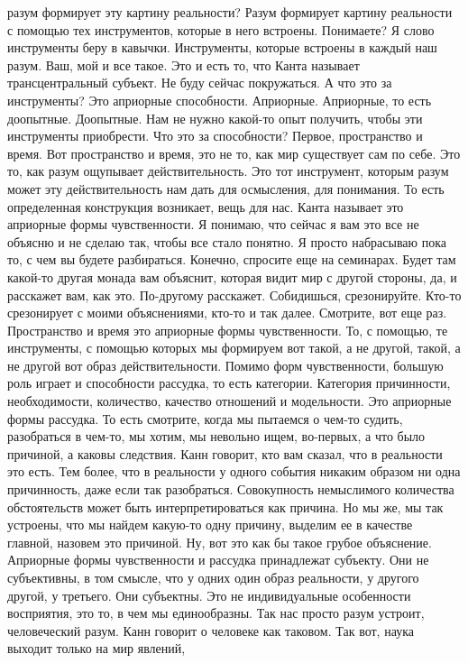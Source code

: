 разум формирует эту картину реальности? Разум формирует картину реальности с
помощью тех инструментов, которые в него встроены. Понимаете? Я слово
инструменты беру в кавычки. Инструменты, которые встроены в каждый наш разум.
Ваш, мой и все такое. Это и есть то, что Канта называет трансцентральный
субъект. Не буду сейчас покружаться. А что это за инструменты? Это априорные
способности. Априорные. Априорные, то есть доопытные. Доопытные. Нам не нужно
какой-то опыт получить, чтобы эти инструменты приобрести. Что это за
способности? Первое, пространство и время. Вот пространство и время, это не то,
как мир существует сам по себе. Это то, как разум ощупывает действительность.
Это тот инструмент, которым разум может эту действительность нам дать для
осмысления, для понимания. То есть определенная конструкция возникает, вещь для
нас. Канта называет это априорные формы чувственности. Я понимаю, что сейчас я
вам это все не объясню и не сделаю так, чтобы все стало понятно. Я просто
набрасываю пока то, с чем вы будете разбираться. Конечно, спросите еще на
семинарах. Будет там какой-то другая монада вам объяснит, которая видит мир с
другой стороны, да, и расскажет вам, как это. По-другому расскажет. Собидишься,
срезонируйте. Кто-то срезонирует с моими объяснениями, кто-то и так далее.
Смотрите, вот еще раз. Пространство и время это априорные формы чувственности.
То, с помощью, те инструменты, с помощью которых мы формируем вот такой, а не
другой, такой, а не другой вот образ действительности. Помимо форм
чувственности, большую роль играет и способности рассудка, то есть категории.
Категория причинности, необходимости, количество, качество отношений и
модельности. Это априорные формы рассудка. То есть смотрите, когда мы пытаемся о
чем-то судить, разобраться в чем-то, мы хотим, мы невольно ищем, во-первых, а
что было причиной, а каковы следствия. Канн говорит, кто вам сказал, что в
реальности это есть. Тем более, что в реальности у одного события никаким
образом ни одна причинность, даже если так разобраться. Совокупность немыслимого
количества обстоятельств может быть интерпретироваться как причина. Но мы же, мы
так устроены, что мы найдем какую-то одну причину, выделим ее в качестве
главной, назовем это причиной. Ну, вот это как бы такое грубое объяснение.
Априорные формы чувственности и рассудка принадлежат субъекту. Они не
субъективны, в том смысле, что у одних один образ реальности, у другого другой,
у третьего. Они субъектны. Это не индивидуальные особенности восприятия, это то,
в чем мы единообразны. Так нас просто разум устроит, человеческий разум. Канн
говорит о человеке как таковом. Так вот, наука выходит только на мир явлений,
